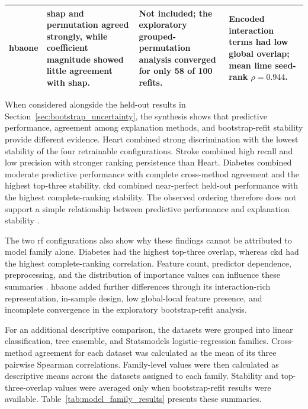 \begin{table}[!t]
\begin{tabularx}{\textwidth}{
        @{}l
        >{\RaggedRight\arraybackslash}X
        >{\RaggedRight\arraybackslash}X
        >{\RaggedRight\arraybackslash}X@{}
    }
        \gls{hbaone}
        & \gls{shap} and permutation agreed strongly, while coefficient
        magnitude showed little agreement with \gls{shap}.
        & Not included; the exploratory grouped-permutation analysis
        converged for only 58 of 100 refits.
        & Encoded interaction terms had low global overlap; mean
        \gls{lime} seed-rank $\rho=0.944$. \\

        \bottomrule
    \end{tabularx}
\end{table}

When considered alongside the held-out results in Section~\ref{sec:bootstrap_uncertainty}, the synthesis shows that predictive performance, agreement among explanation methods, and bootstrap-refit stability provide different evidence. Heart combined strong discrimination with the lowest stability of the four retrainable configurations. Stroke combined high recall and low precision with stronger ranking persistence than Heart. Diabetes combined moderate predictive performance with complete cross-method agreement and the highest top-three stability. \gls{ckd} combined near-perfect held-out performance with the highest complete-ranking stability. The observed ordering therefore does not support a simple relationship between predictive performance and explanation stability \citep{lofstrom_meta_2022, canha_functionally-grounded_2025}.

The two \gls{rf} configurations also show why these findings cannot be attributed to model family alone. Diabetes had the highest top-three overlap, whereas \gls{ckd} had the highest complete-ranking correlation. Feature count, predictor dependence, preprocessing, and the distribution of importance values can influence these summaries \citep{fisher_models_2019, vilone_classification_2021}. \gls{hbaone} added further differences through its interaction-rich representation, in-sample design, low global-local feature presence, and incomplete convergence in the exploratory bootstrap-refit analysis.

\FloatBarrier

For an additional descriptive comparison, the datasets were grouped into linear classification, tree ensemble, and Statsmodels logistic-regression families. Cross-method agreement for each dataset was calculated as the mean of its three pairwise Spearman correlations. Family-level values were then calculated as descriptive means across the datasets assigned to each family. Stability and top-three-overlap values were averaged only when bootstrap-refit results were available. Table~\ref{tab:model_family_results} presents these summaries.

